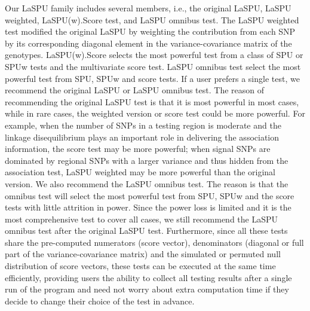 \documentclass[12pt]{article}
\begin{document}
Our LaSPU family includes several members, i.e., the original LaSPU, LaSPU weighted, LaSPU(w).Score test, and LaSPU omnibus test. The LaSPU weighted test modified the original LaSPU by weighting the contribution from each SNP by its corresponding diagonal element in the variance-covariance matrix of the genotypes. LaSPU(w).Score selects the most powerful test from a class of SPU or SPUw tests and the multivariate score test. LaSPU omnibus test select the most powerful test from SPU, SPUw and score tests. If a user prefers a single test, we recommend the original LaSPU or LaSPU omnibus test. The reason of recommending the original LaSPU test is that it is most powerful in most cases, while in rare cases, the weighted version or score test could be more powerful. For example, when the number of SNPs in a testing region is moderate and the linkage disequilibrium plays an important role in delivering the association information, the score test may be more powerful; when signal SNPs are dominated by regional SNPs with a larger variance and thus hidden from the association test, LaSPU weighted may be more powerful than the original version. We also recommend the LaSPU omnibus test. The reason is that the omnibus test will select the most powerful test from SPU, SPUw and the score tests with little attrition in power. Since the power loss is limited and it is the most comprehensive test to cover all cases, we still recommend the LaSPU omnibus test after the original LaSPU test. Furthermore, since all these tests share the pre-computed numerators (score vector), denominators (diagonal or full part of the variance-covariance matrix) and the simulated or permuted null distribution of score vectors, these tests can be executed at the same time efficiently, providing users the ability to collect all testing results after a single run of the program and need not worry about extra computation time if they decide to change their choice of the test in advance. 
\end{document}
